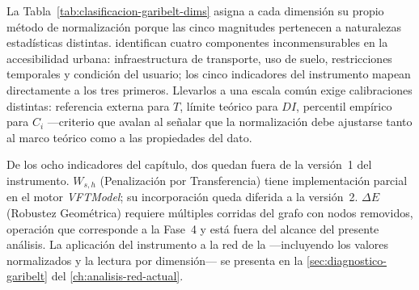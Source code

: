 La Tabla~\ref{tab:clasificacion-garibelt-dims} asigna a cada dimensión su propio
método de normalización porque las cinco magnitudes pertenecen a naturalezas
estadísticas distintas. \citet{bocarejo2012} identifican cuatro componentes
inconmensurables en la accesibilidad urbana: infraestructura de transporte, uso
de suelo, restricciones temporales y condición del usuario; los cinco indicadores
del instrumento mapean directamente a los tres primeros. Llevarlos a una escala
común exige calibraciones distintas: referencia externa para $T$, límite teórico
para $DI$, percentil empírico para $C_i$ ---criterio que \citet{talukder2017}
avalan al señalar que la normalización debe ajustarse tanto al marco teórico como
a las propiedades del dato.

De los ocho indicadores del capítulo, dos quedan fuera de la versión~1 del
instrumento. $W_{s,h}$ (Penalización por Transferencia) tiene implementación
parcial en el motor \textit{VFTModel}; su incorporación queda diferida a la
versión~2. $\Delta E$ (Robustez Geométrica) requiere múltiples corridas del grafo
con nodos removidos, operación que corresponde a la Fase~4 y está fuera del
alcance del presente análisis. La aplicación del instrumento a la red de la
\zmvm{} ---incluyendo los valores normalizados y la lectura por dimensión--- se
presenta en la \autoref{sec:diagnostico-garibelt} del
\autoref{ch:analisis-red-actual}.
